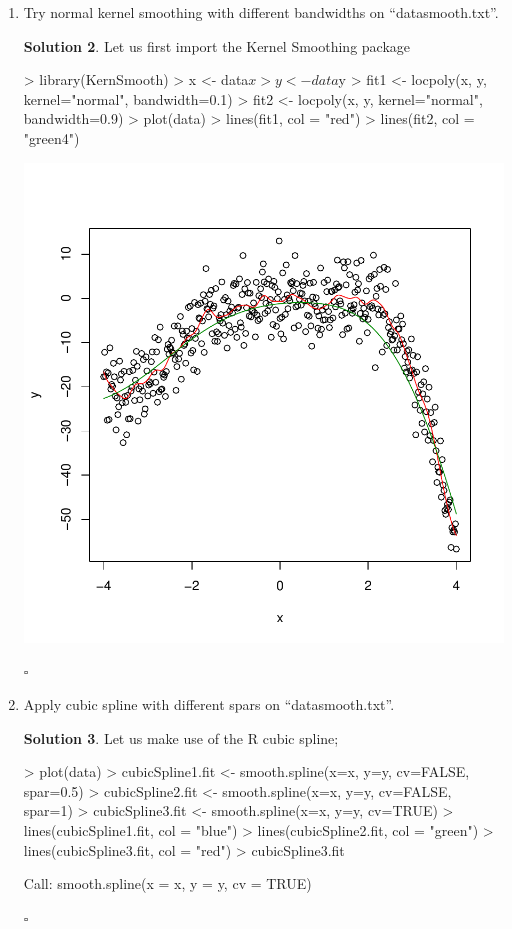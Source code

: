 \documentclass[twoside]{article}
\theoremstyle{definition}
\newtheorem*{solutionT}{Solution}
\newenvironment{solution}{\begin{cBox}\begin{solutionT}}{\hfill{\scriptsize\ensuremath{\square}}\end{solutionT}\end{cBox}}
\theoremstyle{definition}
\begin{document}
\begin{enumerate}
\begin{solution}
\end{solution}
\item Try normal kernel smoothing with different bandwidths on “datasmooth.txt”.
\begin{solution}
Let us first import the Kernel Smoothing package
\begin{Schunk}
\begin{Sinput}
> library(KernSmooth)
> x <- data$x
> y <- data$y
> fit1 <- locpoly(x, y, kernel="normal", bandwidth=0.1)
> fit2 <- locpoly(x, y, kernel="normal", bandwidth=0.9)
> plot(data)
> lines(fit1, col = "red")
> lines(fit2, col = "green4")
\end{Sinput}
\end{Schunk}
\includegraphics{week4-002}

\end{solution}
\item Apply cubic spline with different spars on “datasmooth.txt”. 
\begin{solution}
Let us make use of the R cubic spline;
\begin{Schunk}
\begin{Sinput}
> plot(data)
> cubicSpline1.fit <- smooth.spline(x=x, y=y, cv=FALSE, spar=0.5)
> cubicSpline2.fit <- smooth.spline(x=x, y=y, cv=FALSE, spar=1)
> cubicSpline3.fit <- smooth.spline(x=x, y=y, cv=TRUE)
> lines(cubicSpline1.fit, col = "blue")
> lines(cubicSpline2.fit, col = "green")
> lines(cubicSpline3.fit, col = "red")
> cubicSpline3.fit
\end{Sinput}
\begin{Soutput}
Call:
smooth.spline(x = x, y = y, cv = TRUE)


\end{Soutput}
\end{Schunk}
\end{solution}
\end{enumerate}
\end{document}
